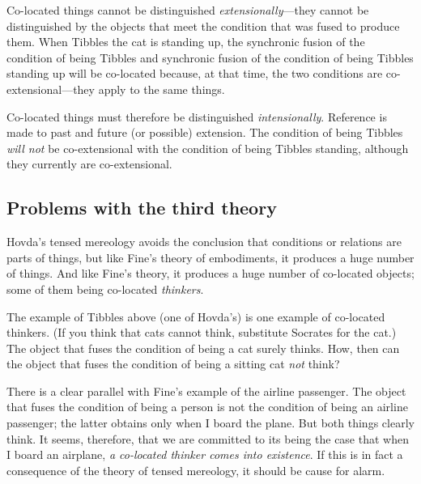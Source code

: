 \documentclass[11pt]{article}
\begin{document}
\begin{spacing}{1.5}
Co-located things cannot be distinguished {\em extensionally}---they
cannot be distinguished by the objects that meet the condition that
was fused to produce them.  When Tibbles the cat is standing up, the
synchronic fusion of the condition of being Tibbles and synchronic
fusion of the condition of being Tibbles standing up will be
co-located because, at that time, the two conditions are
co-extensional---they apply to the same things.

Co-located things must therefore be distinguished {\em intensionally}.
Reference is made to past and future (or possible) extension.  The
condition of being Tibbles {\em will not} be co-extensional with the
condition of being Tibbles standing, although they currently are
co-extensional.  



\subsection{Problems with the third theory}
\label{problems2}
Hovda's tensed mereology avoids the conclusion that conditions or
relations are parts of things, but like Fine's theory of embodiments,
it produces a huge number of things.  And like Fine's theory, it
produces a huge number of co-located objects; some of them being
co-located {\em thinkers}.

The example of Tibbles above (one of Hovda's) is one example of
co-located thinkers.  (If you think that cats cannot think, substitute
Socrates for the cat.)  The object that fuses the condition of being a
cat surely thinks.  How, then can the object that fuses the condition
of being a sitting cat {\em not} think?

There is a clear parallel with Fine's example of the airline
passenger.  The object that fuses the condition of being a person is
not the condition of being an airline passenger; the latter obtains
only when I board the plane.  But both things clearly think.  It
seems, therefore, that we are committed to its being the case that
when I board an airplane, {\em a co-located thinker comes into
  existence}.  If this is in fact a consequence of the theory of
tensed mereology, it should be cause for alarm.


\end{spacing}
\end{document}
